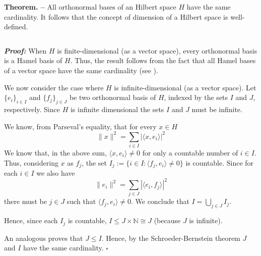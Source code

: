 \documentclass[12pt]{article}
\begin{document}
{\bf Theorem. --} All orthonormal bases of an Hilbert space $H$ have the same cardinality. It follows that the concept of dimension of a Hilbert space is well-defined.

$\,$

{\bf \emph{Proof:}} When $H$ is finite-dimensional (as a vector space), every orthonormal basis is a Hamel basis of $H$. Thus, the result follows from the fact that all Hamel bases of a vector space have the same cardinality (see ).

We now consider the case where $H$ is infinite-dimensional (as a vector space). Let $\{e_i\}_{i \in I}$ and $\{f_j\}_{j \in J}$ be two orthonormal basis of $H$, indexed by the sets $I$ and $J$, respectively. Since $H$ is infinite dimensional the sets $I$ and $J$ must be infinite.

We know, from Parseval's equality, that for every $x \in H$
\begin{displaymath}
\|x\|^2 = \sum_{i \in I} |\langle x, e_i \rangle|^2
\end{displaymath}
We know that, in the above sum, $\langle x, e_i \rangle \neq 0$ for only a countable number of $i \in I$.  Thus, considering $x$ as $f_j$, the set $I_j := \{ i \in I: \langle f_j, e_i \rangle \neq 0 \}$ is countable.   Since for each $i \in I$ we also have
\begin{displaymath}
\|e_i\|^2 = \sum_{j \in J}| \langle e_i, f_j \rangle|^2
\end{displaymath}
there must be $j \in J$ such that $\langle f_j, e_i \rangle \neq 0$. We conclude that $\displaystyle I = \bigcup_{j \in J} I_j$.

Hence, since each $I_j$ is countable, $I \leq J\!\times\!\mathbb{N} \cong J$ (because $J$ is infinite).

An analogous  proves that $J \leq I$.  Hence, by the Schroeder-Bernstein theorem $J$ and $I$ have the same cardinality. $\square$
\end{document}
